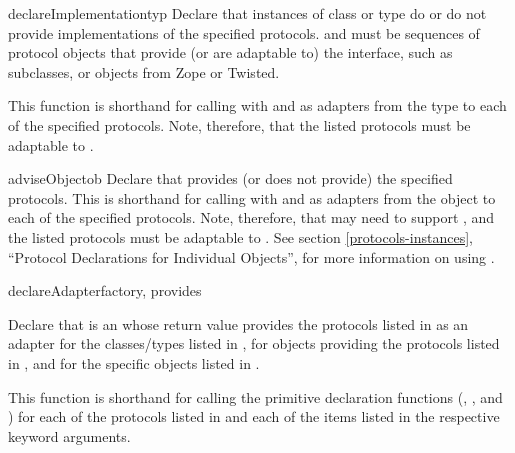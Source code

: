 \begin{verbatim%
}
\begin{verbatim%
}
\begin{verbatim%
}
\begin{verbatim%
}
\begin{verbatim%
}
\begin{verbatim%
}
\begin{funcdesc}{declareImplementation}{typ
 }
Declare that instances of class or type  do or do not provide
implementations of the specified protocols.   and
 must be sequences of protocol objects that
provide (or are adaptable to) the  interface,
such as  subclasses, or  objects
from Zope or Twisted.

This function is shorthand for calling 
with  and  as adapters
from the type to each of the specified protocols.  Note, therefore, that the
listed protocols must be adaptable to .
\end{funcdesc}


\begin{funcdesc}{adviseObject}{ob
 }
Declare that  provides (or does not provide) the specified protocols.
This is shorthand for calling 
with  and  as adapters
from the object to each of the specified protocols.  Note, therefore, that
 may need to support , and the listed protocols
must be adaptable to .  See section
\ref{protocols-instances}, ``Protocol Declarations for Individual Objects'',
for more information on using .
\end{funcdesc}













\begin{funcdesc}{declareAdapter}{factory, provides
 
}

Declare that  is an  whose return value
provides the protocols listed in  as an adapter for the
classes/types listed in , for objects providing the protocols
listed in , and for the specific objects listed in
.

This function is shorthand for calling the primitive declaration
functions (,
, and )
for each of the protocols listed in  and each of the
items listed in the respective keyword arguments.
\end{funcdesc}



\end{verbatim%
}
\end{verbatim%
}
\end{verbatim%
}
\end{verbatim%
}
\end{verbatim%
}
\end{verbatim%
}
